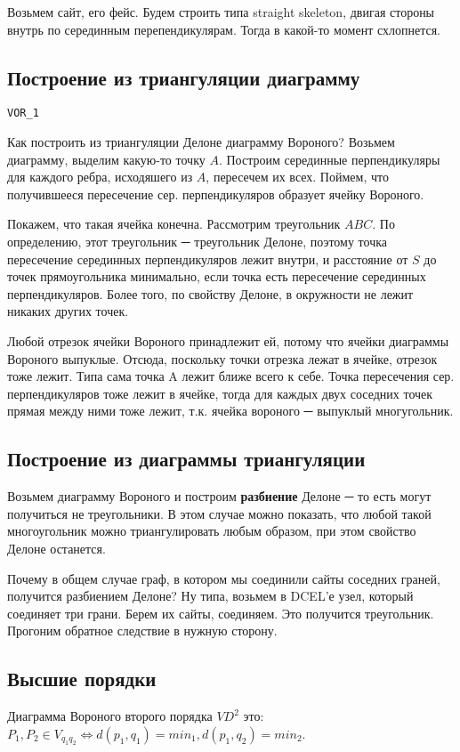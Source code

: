 \documentclass[11pt]{article}
\begin{document}
Возьмем сайт, его фейс. Будем строить типа straight skeleton,
двигая стороны внутрь по серединным перепендикулярам. Тогда в
какой-то момент схлопнется.
\subsection{Построение из триангуляции диаграмму}
\label{sec-24-3}
\verb~VOR_1~

Как построить из триангуляции Делоне диаграмму Вороного?  Возьмем
диаграмму, выделим какую-то точку $A$. Построим серединные
перпендикуляры для каждого ребра, исходяшего из $A$, пересечем их
всех. Поймем, что получившееся пересечение сер. перпендикуляров
образует ячейку Вороного.

Покажем, что такая ячейка конечна. Рассмотрим треугольник $ABC$. По
определению, этот треугольник ─ треугольник Делоне, поэтому точка
пересечение серединных перпендикуляров лежит внутри, и расстояние
от $S$ до точек прямоугольника минимально, если точка есть
пересечение серединных перпендикуляров. Более того, по свойству
Делоне, в окружности не лежит никаких других точек.

Любой отрезок ячейки Вороного принадлежит ей, потому что ячейки
диаграммы Вороного выпуклые. Отсюда, поскольку точки отрезка лежат в
ячейке, отрезок тоже лежит. Типа сама точка A лежит ближе всего к
себе. Точка пересечения сер. перпендикуляров тоже лежит в ячейке,
тогда для каждых двух соседних точек прямая между ними тоже лежит,
т.к. ячейка вороного ─ выпуклый многугольник.
\subsection{Построение из диаграммы триангуляции}
\label{sec-24-4}
Возьмем диаграмму Вороного и построим \textbf{разбиение} Делоне ─ то есть
могут получиться не треугольники. В этом случае можно показать, что
любой такой многоугольник можно триангулировать любым образом, при
этом свойство Делоне останется.

Почему в общем случае граф, в котором мы соединили сайты соседних
граней, получится разбиением Делоне? Ну типа, возьмем в DCEL'е
узел, который соединяет три грани. Берем их сайты, соединяем. Это
получится треугольник. Прогоним обратное следствие в нужную
сторону.
\subsection{Высшие порядки}
\label{sec-24-5}
Диаграмма Вороного второго порядка $VD^2$ это: $P_1, P_2 \in
   V_{q_1q_2} ⇔ d(p_1, q_1) = min_1, d(p_1,q_2) = min_2$.
\end{document}
